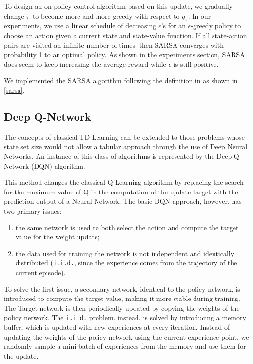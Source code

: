 \documentclass[letterpaper]{article} %
\begin{document}
To design an on-policy control algorithm based on this update, we gradually change $\pi$ to become more and more greedy with respect to $q_\pi$. In our experiments, we use a linear schedule of decreasing $\epsilon$'s for an $\epsilon$-greedy policy to choose an action given a current state and state-value function. If all state-action pairs are visited an infinite number of times, then SARSA converges with probability 1 to an optimal policy. As shown in the experiments section, SARSA does seem to keep increasing the average reward while $\epsilon$ is still positive. 
 
We implemented the SARSA algorithm following the definition in \cite{sutton_barto} as shown in \cref{sarsa}. 



\subsection{Deep Q-Network}

The concepts of classical TD-Learning can be extended to those problems whose state set size would not allow a tabular approach through the use of Deep Neural Networks. An instance of this class of algorithms is represented by the Deep Q-Network (DQN) algorithm. 

This method changes the classical Q-Learning algorithm by replacing the search for the maximum value of Q in the computation of the update target with the prediction output of a Neural Network. The basic DQN approach, however, has two primary issues:
\begin{enumerate}
    \item the same network is used to both select the action and compute the target value for the weight update;
    \item the data used for training the network is not independent and identically distributed (\verb|i.i.d.|, since the experience comes from the trajectory of the current episode).
\end{enumerate}

To solve the first issue, a secondary network, identical to the policy network, is introduced to compute the target value, making it more stable during training. The Target network is then periodically updated by copying the weights of the policy network.
The \verb|i.i.d.| problem, instead, is solved by introducing a memory buffer, which is updated with new experiences at every iteration. Instead of updating the weights of the policy network using the current experience point, we randomly sample a mini-batch of experiences from the memory and use them for the update.
\end{document}
